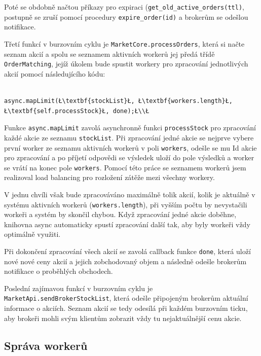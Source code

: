 \documentclass[thesis=M,czech]{FITthesis}[2012/06/26]
\begin{document}
	Poté se obdobně načtou příkazy pro expiraci (\texttt{get\_old\_active\_orders(ttl)}, postupně se zruší pomocí procedury \texttt{expire\_order(id)} a brokerům se odešlou notifikace.
	
	Třetí funkcí v burzovním cyklu je \texttt{MarketCore.processOrders}, která si načte seznam akcií a spolu se seznamem aktivních workerů jej předá třídě \texttt{OrderMatching}, jejíž úkolem bude spustit workery pro zpracování jednotlivých akcií pomocí následujícího kódu:
	
\begin{lstlisting}

async.mapLimit(Ł\textbf{stockList}Ł, Ł\textbf{workers.length}Ł, Ł\textbf{self.processStock}Ł, done);Ł\\Ł
\end{lstlisting}

	Funkce \texttt{async.mapLimit} zavolá asynchronně funkci \texttt{processStock} pro zpracování každé akcie ze seznamu \texttt{stockList}. Při zpracování jedné akcie se nejprve vybere první worker ze seznamu aktivních workerů v poli \texttt{workers}, odešle se mu Id akcie pro zpracování a po příjetí odpovědi se výsledek uloží do pole výsledků a worker se vrátí na konec pole \texttt{workers}. Pomocí této práce se seznamem workerů jsem realizoval load balancing pro rozložení zátěže mezi všechny workery. 
 
	V jednu chvíli však bude zpracováváno maximálně tolik akcií, kolik je aktuálně v systému aktivních workerů (\texttt{workers.length}), při vyšším počtu by nevystačili workeři a systém by skončil chybou. Když zpracování jedné akcie doběhne, knihovna async automaticky spustí zpracování další tak, aby byly workeři vždy optimálně využiti.
	
	Při dokončení zpracování všech akcií se zavolá callback funkce \texttt{done}, která uloží nové nové ceny akcií a jejich zobchodovaný objem a následně odešle brokerům notifikace o proběhlých obchodech.
	
	Poslední zajímavou funkcí v burzovním cyklu je \texttt{MarketApi.sendBrokerStockList}, která odešle připojeným brokerům aktuální informace o akciích. Seznam akcií se tedy odesílá při každém burzovním ticku, aby brokeři mohli svým klientům zobrazit vždy tu nejaktuálnější cenu akcie.
    

\subsection{Správa workerů}
\end{document}
